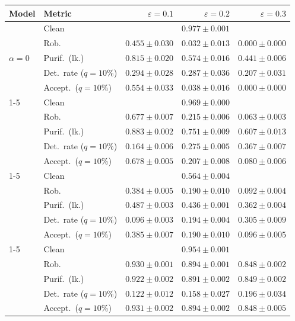 \begin{tabular}{@{}llrrr@{}}
\toprule
Model & Metric & $\varepsilon=0.1$ & $\varepsilon=0.2$ & $\varepsilon=0.3$ \\
\midrule
\multirow{5}{*}{$\alpha{=}0$} & Clean & \multicolumn{3}{c}{$\mathbf{0.977 \pm 0.001}$} \\
 & Rob. & $0.455 \pm 0.030$ & $0.032 \pm 0.013$ & $0.000 \pm 0.000$ \\
 & Purif.\ (lk.) & $0.815 \pm 0.020$ & $0.574 \pm 0.016$ & $0.441 \pm 0.006$ \\
 & Det.\ rate ($q{=}10\%$) & $\mathbf{0.294 \pm 0.028}$ & $\mathbf{0.287 \pm 0.036}$ & $0.207 \pm 0.031$ \\
 & Accept.\ ($q{=}10\%$) & $0.554 \pm 0.033$ & $0.038 \pm 0.016$ & $0.000 \pm 0.000$ \\
\cmidrule(lr){1-5}
\multirow{5}{*}{$\alpha{=}0.01$} & Clean & \multicolumn{3}{c}{$0.969 \pm 0.000$} \\
 & Rob. & $0.677 \pm 0.007$ & $0.215 \pm 0.006$ & $0.063 \pm 0.003$ \\
 & Purif.\ (lk.) & $0.883 \pm 0.002$ & $0.751 \pm 0.009$ & $0.607 \pm 0.013$ \\
 & Det.\ rate ($q{=}10\%$) & $0.164 \pm 0.006$ & $0.275 \pm 0.005$ & $\mathbf{0.367 \pm 0.007}$ \\
 & Accept.\ ($q{=}10\%$) & $0.678 \pm 0.005$ & $0.207 \pm 0.008$ & $0.080 \pm 0.006$ \\
\cmidrule(lr){1-5}
\multirow{5}{*}{$\alpha{=}0.5$} & Clean & \multicolumn{3}{c}{$0.564 \pm 0.004$} \\
 & Rob. & $0.384 \pm 0.005$ & $0.190 \pm 0.010$ & $0.092 \pm 0.004$ \\
 & Purif.\ (lk.) & $0.487 \pm 0.003$ & $0.436 \pm 0.001$ & $0.362 \pm 0.004$ \\
 & Det.\ rate ($q{=}10\%$) & $0.096 \pm 0.003$ & $0.194 \pm 0.004$ & $0.305 \pm 0.009$ \\
 & Accept.\ ($q{=}10\%$) & $0.385 \pm 0.007$ & $0.190 \pm 0.010$ & $0.096 \pm 0.005$ \\
\cmidrule(lr){1-5}
\multirow{5}{*}{AT} & Clean & \multicolumn{3}{c}{$0.954 \pm 0.001$} \\
 & Rob. & $\mathbf{0.930 \pm 0.001}$ & $\mathbf{0.894 \pm 0.001}$ & $\mathbf{0.848 \pm 0.002}$ \\
 & Purif.\ (lk.) & $\mathbf{0.922 \pm 0.002}$ & $\mathbf{0.891 \pm 0.002}$ & $\mathbf{0.849 \pm 0.002}$ \\
 & Det.\ rate ($q{=}10\%$) & $0.122 \pm 0.012$ & $0.158 \pm 0.027$ & $0.196 \pm 0.034$ \\
 & Accept.\ ($q{=}10\%$) & $\mathbf{0.931 \pm 0.002}$ & $\mathbf{0.894 \pm 0.002}$ & $\mathbf{0.848 \pm 0.005}$ \\
\bottomrule
\end{tabular}
